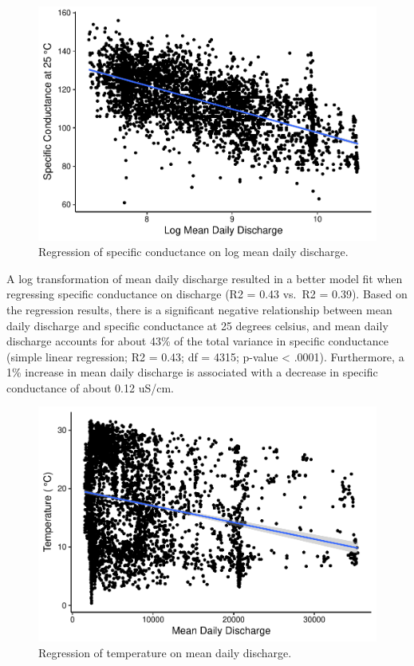 \documentclass[12pt,]{article}
\begin{document}
\begin{figure}
\centering
\includegraphics{Project_Template_files/figure-latex/unnamed-chunk-10-1.pdf}
\caption{Regression of specific conductance on log mean daily
discharge.}
\end{figure}

A log transformation of mean daily discharge resulted in a better model
fit when regressing specific conductance on discharge (R2 = 0.43 vs.~R2
= 0.39). Based on the regression results, there is a significant
negative relationship between mean daily discharge and specific
conductance at 25 degrees celsius, and mean daily discharge accounts for
about 43\% of the total variance in specific conductance (simple linear
regression; R2 = 0.43; df = 4315; p-value \textless{} .0001).
Furthermore, a 1\% increase in mean daily discharge is associated with a
decrease in specific conductance of about 0.12 uS/cm.

\newpage

\begin{figure}
\centering
\includegraphics{Project_Template_files/figure-latex/unnamed-chunk-12-1.pdf}
\caption{Regression of temperature on mean daily discharge.}
\end{figure}
\end{document}
